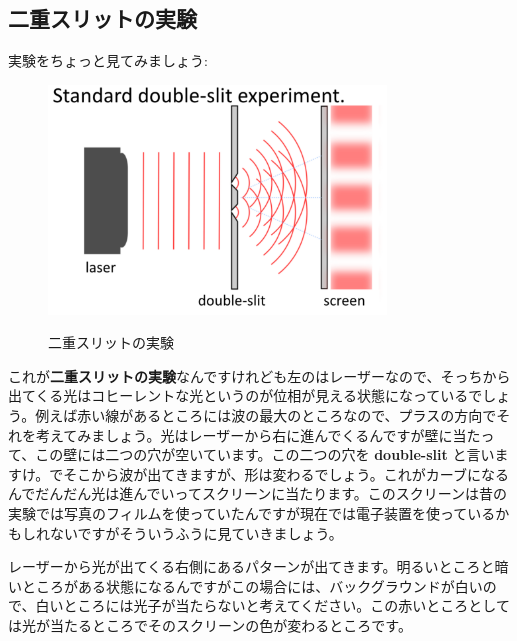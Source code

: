 \subsection{二重スリットの実験}

実験をちょっと見てみましょう:
\begin{figure}[H]
   \centering
    \includegraphics[width=0.8\textwidth]{lesson6/standard_double_slit.pdf}
    \label{fig: 1}
    \begin{center}
        \caption{二重スリットの実験}
    \end{center}
\end{figure}

これが\textbf{二重スリットの実験}なんですけれども左のはレーザーなので、そっちから出てくる光はコヒーレントな光というのが位相が見える状態になっているでしょう。例えば赤い線があるところには波の最大のところなので、プラスの方向でそれを考えてみましょう。光はレーザーから右に進んでくるんですが壁に当たって、この壁には二つの穴が空いています。この二つの穴を \textbf{double-slit} と言いますけ。でそこから波が出てきますが、形は変わるでしょう。これがカーブになるんでだんだん光は進んでいってスクリーンに当たります。このスクリーンは昔の実験では写真のフィルムを使っていたんですが現在では電子装置を使っているかもしれないですがそういうふうに見ていきましょう。

レーザーから光が出てくる右側にあるパターンが出てきます。明るいところと暗いところがある状態になるんですがこの場合には、バックグラウンドが白いので、白いところには光子が当たらないと考えてください。この赤いところとしては光が当たるところでそのスクリーンの色が変わるところです。

